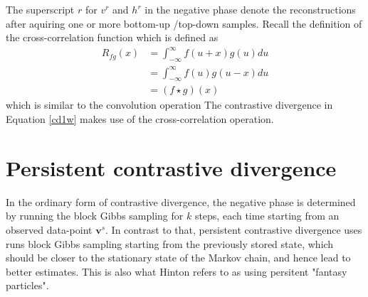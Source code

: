 \documentclass[12pt]{article}
\begin{document}
The superscript $r$ for $v^r$ and $h^r$ in the negative phase denote the
reconstructions after aquiring one or more bottom-up /top-down samples.
Recall the definition of the cross-correlation function which is defined as
\begin{align}
 R_{fg}(x)&=\int_{-\infty}^\infty f(u+x)g(u)du\\
 &=\int_{-\infty}^\infty f(u)g(u-x)du\\
 &=(f\star g)(x)
\end{align}
which is similar to the convolution operation
The contrastive divergence in Equation \ref{cd1w} makes 
use of the cross-correlation operation.
\section{Persistent contrastive divergence}
In the ordinary form of contrastive divergence, the negative phase is
determined by running the block Gibbs sampling for $k$ steps, each time
starting from an observed data-point $\mathbf{v}^s$. 
In contrast to that, persistent contrastive divergence uses runs
block Gibbs sampling starting from  the previously stored state, which
should be closer to the stationary state of the Markov chain, 
and hence lead to better estimates.
This is also what Hinton refers to as using persitent "fantasy particles".
\end{document}
